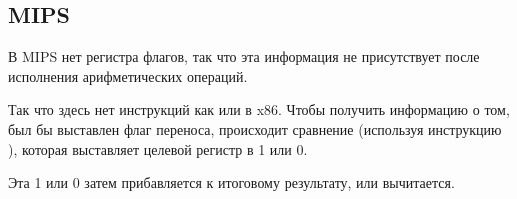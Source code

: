 \subsection{MIPS}



В MIPS нет регистра флагов, так что эта информация не присутствует после исполнения арифметических операций.

Так что здесь нет инструкций как  или  в x86.
Чтобы получить информацию о том, был бы выставлен флаг переноса, происходит сравнение (используя инструкцию
), которая выставляет целевой регистр в 1 или 0.

Эта 1 или 0 затем прибавляется к итоговому результату, или вычитается.

